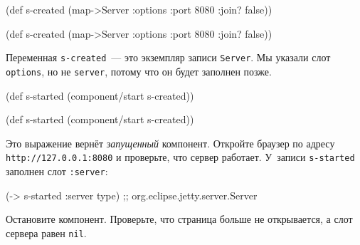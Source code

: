 \ifx\DEVICETYPE\MOBILE

\begin{english}
  \begin{clojure}
(def s-created
  (map->Server
    {:options {:port 8080
               :join? false}}))
  \end{clojure}
\end{english}

\else

\begin{english}
  \begin{clojure}
(def s-created
  (map->Server {:options {:port 8080 :join? false}}))
  \end{clojure}
\end{english}

\fi

Переменная \verb|s-created|~--- это экземпляр записи \verb|Server|. Мы указали
слот \verb|options|, но не \verb|server|, потому что он будет заполнен
позже.

\ifx\DEVICETYPE\MOBILE

\begin{english}
  \begin{clojure}
(def s-started
  (component/start s-created))
  \end{clojure}
\end{english}

\else

\begin{english}
  \begin{clojure}
(def s-started (component/start s-created))
  \end{clojure}
\end{english}

\fi

\mnoindent
Это выражение вернёт \emph{запущенный} компонент. Откройте браузер по адресу
\texttt{http://127.0.0.1\-:8080} и проверьте, что сервер работает. У~записи
\verb|s-started| заполнен слот \verb|:server|:

\begin{english}
  \begin{clojure}
(-> s-started :server type)
;; org.eclipse.jetty.server.Server
  \end{clojure}
\end{english}

Остановите компонент. Проверьте, что страница больше не открывается, а слот
сервера равен \verb|nil|.

\ifx\DEVICETYPE\MOBILE

